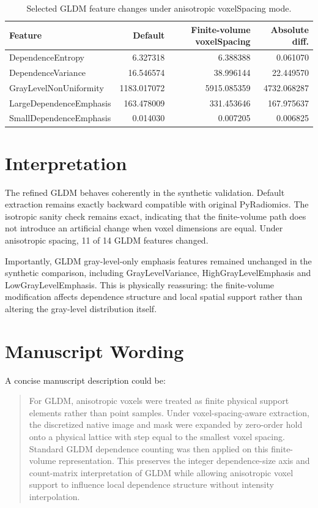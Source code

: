 \documentclass[11pt,a4paper]{article}
\begin{document}
\begin{table}[h]
\centering
\caption{Selected GLDM feature changes under anisotropic voxelSpacing mode.}
\begin{tabular}{lrrr}
\toprule
Feature & Default & Finite-volume voxelSpacing & Absolute diff. \\
\midrule
DependenceEntropy & 6.327318 & 6.388388 & 0.061070 \\
DependenceVariance & 16.546574 & 38.996144 & 22.449570 \\
GrayLevelNonUniformity & 1183.017072 & 5915.085359 & 4732.068287 \\
LargeDependenceEmphasis & 163.478009 & 331.453646 & 167.975637 \\
SmallDependenceEmphasis & 0.014030 & 0.007205 & 0.006825 \\
\bottomrule
\end{tabular}
\end{table}

\section*{Interpretation}
The refined GLDM behaves coherently in the synthetic validation. Default extraction remains exactly backward compatible with original PyRadiomics. The isotropic sanity check remains exact, indicating that the finite-volume path does not introduce an artificial change when voxel dimensions are equal. Under anisotropic spacing, 11 of 14 GLDM features changed.

Importantly, GLDM gray-level-only emphasis features remained unchanged in the synthetic comparison, including GrayLevelVariance, HighGrayLevelEmphasis and LowGrayLevelEmphasis. This is physically reassuring: the finite-volume modification affects dependence structure and local spatial support rather than altering the gray-level distribution itself.

\section*{Manuscript Wording}
A concise manuscript description could be:

\begin{quote}
For GLDM, anisotropic voxels were treated as finite physical support elements rather than point samples. Under voxel-spacing-aware extraction, the discretized native image and mask were expanded by zero-order hold onto a physical lattice with step equal to the smallest voxel spacing. Standard GLDM dependence counting was then applied on this finite-volume representation. This preserves the integer dependence-size axis and count-matrix interpretation of GLDM while allowing anisotropic voxel support to influence local dependence structure without intensity interpolation.
\end{quote}
\end{document}
